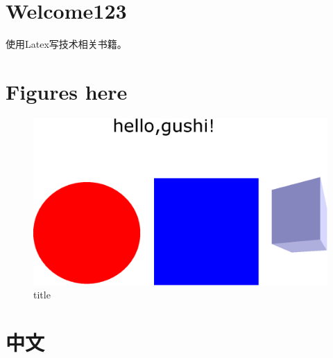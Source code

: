 \documentclass[a4paper,12pt]{article}
\begin{document}




\section{Welcome123}

使用Latex写技术相关书籍。





\section{Figures here}
\begin{figure}
\centering
\includegraphics[width=\textwidth]{hello.eps}
\caption{title}
\end{figure}

\section{中文}
\end{document}
